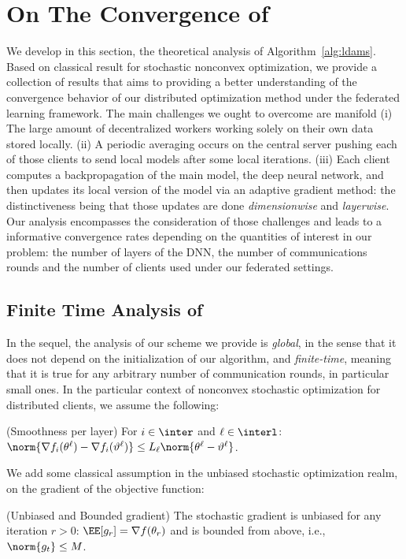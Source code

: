 \documentclass[11pt]{article}
\begin{document}
\section{On The Convergence of \algo}\label{sec:theory}
We develop in this section, the theoretical analysis of Algorithm~\ref{alg:ldams}. 
Based on classical result for stochastic nonconvex optimization, we provide a collection of results that aims to providing a better understanding of the convergence behavior of our distributed optimization method under the federated learning framework.
The main challenges we ought to overcome are manifold 
(i) The large amount of decentralized workers working solely on their own data stored locally. 
(ii) A periodic averaging occurs on the central server pushing each of those clients to send local models after some local iterations. 
(iii) Each client computes a backpropagation of the main model, \ie the deep neural network, and then updates its local version of the model via an adaptive gradient method: the distinctiveness being that those updates are done \emph{dimensionwise} and \emph{layerwise}.
Our analysis encompasses the consideration of those challenges and leads to a informative convergence rates depending on the quantities of interest in our problem: the number of layers of the DNN, the number of communications rounds and the number of clients used under our federated settings.

\subsection{Finite Time Analysis of \algo}
In the sequel, the analysis of our scheme we provide is \emph{global}, in the sense that it does not depend on the initialization of our algorithm, and \emph{finite-time}, meaning that it is true for any arbitrary number of communication rounds, in particular small ones.
In the particular context of nonconvex stochastic optimization for distributed clients, we assume the following:

\begin{assumption}\label{ass:smooth}(Smoothness per layer)
For $i \in \inter$ and $\ell \in \interl$: $\norm{\nabla f_i (\theta^\ell) - \nabla f_i (\vartheta^\ell)} \leq L_\ell \norm{\theta^\ell-\vartheta^\ell}$.
\end{assumption}
We add some classical assumption in the unbiased stochastic optimization realm, on the gradient of the objective function:
\begin{assumption}\label{ass:boundgrad}(Unbiased and Bounded gradient)
The stochastic gradient is unbiased for any iteration $r>0$: $\EE[g_r] = \nabla f(\theta_r)$ and is bounded from above, i.e., $\norm{g_t} \leq M$.
\end{assumption}
\end{document}
